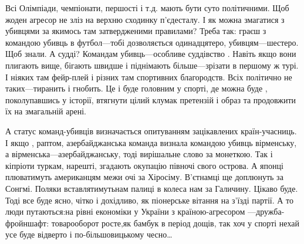 Всі  Олімпіади, чемпіонати, першості і т.д. мають бути суто політичними. Щоб
жоден агресор не зліз на верхню сходинку п'єдесталу. І як можна змагатися з
убивцями за якимось там затвердженими правилами? Треба так: граєш з командою
убивць в футбол—тобі дозволяється одинадцятеро, убивцям—шестеро. Щоб знали. А
судді?   Командам убивць—особливе суддівство . Навіть якщо вони плигають вище,
бігають швидше і піднімають більше—зрізати в першому ж турі.  І ніяких там
фейр-плей і  різних там  спортивних благородств.  Всіх політично не
таких—тиранить і гнобить. Це і буде головним у спорті, де можна буде ,
поколупавшись у історії, втягнути цілий клумак претензій і образ та продовжити
їх на  змагальній арені.

А статус команд-убивців визначається опитуванням зацікавлених країн-учасниць. І
якщо , раптом, азербайджанська команда визнала командою убивць вірменську, а
вірменська—азербайджанську, тоді вирішальне слово за монеткою. Так і кіпріоти
туркам, нарешті, згадають окупацію півночі свого острова. А японці плюватимуть
американцям межи очі за Хіросіму. В'єтнамці ще доплюнуть за Сонгмі. Поляки
вставлятимутьнам палиці в колеса нам за Галичину. Цікаво буде.  Тоді все буде
ясно, чітко і дохідливо, як піонерське вітання на з'їзді партії. А то люди
путаються:на рівні економіки у  України  з країною-агресором —дружба-фройншафт:
товарооборот  росте,як бамбук в період  дощів, так хоч у спорті нехай усе  буде
відверто і по-більшовицькому чесно…


